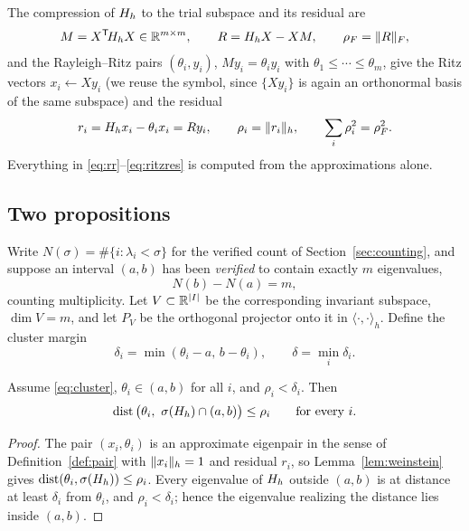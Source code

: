 The compression of $H_h$ to the trial subspace and its residual are
\begin{equation}
  M = X^{\mathsf T}\!H_h X\in\mathbb{R}^{m\times m},\qquad
  R = H_h X - X M ,
  \qquad \rho_F=\lVert R\rVert_F ,
  \label{eq:rr}
\end{equation}
and the Rayleigh--Ritz pairs $(\theta_i,y_i)$, $My_i=\theta_iy_i$ with
$\theta_1\le\cdots\le\theta_m$, give the Ritz vectors $x_i\leftarrow X y_i$
(we reuse the symbol, since $\{Xy_i\}$ is again an orthonormal basis of the
same subspace) and the residual
\begin{equation}
  r_i=H_h x_i-\theta_i x_i = R y_i ,\qquad
  \rho_i=\lVert r_i\rVert_h,\qquad \sum_i \rho_i^2=\rho_F^2 .
  \label{eq:ritzres}
\end{equation}
Everything in \eqref{eq:rr}--\eqref{eq:ritzres} is computed from the
approximations alone.

\subsection{Two propositions}
\label{sec:props}

Write $N(\sigma)=\#\{i:\lambda_i<\sigma\}$ for the verified count of
Section~\ref{sec:counting}, and suppose an interval $(a,b)$ has been
\emph{verified} to contain exactly $m$ eigenvalues,
\begin{equation}
  N(b)-N(a)=m ,
  \label{eq:cluster}
\end{equation}
counting multiplicity. Let $V\subset\mathbb{R}^{|I|}$ be the corresponding invariant
subspace, $\dim V=m$, and let $P_V$ be the orthogonal projector onto it in
$\langle\cdot,\cdot\rangle_h$. Define the cluster margin
\begin{equation}
  \delta_i=\min(\theta_i-a,\,b-\theta_i),\qquad \delta=\min_i\delta_i .
  \label{eq:margin}
\end{equation}

\begin{lemma}\label{lem:cluster}
  Assume \eqref{eq:cluster}, $\theta_i\in(a,b)$ for all $i$, and
  $\rho_i<\delta_i$. Then
  \[
    \operatorname{dist}\big(\theta_i,\ \spec(\Hh)\cap(a,b)\big)\le\rho_i
    \qquad\text{for every }i .
  \]
\end{lemma}
\begin{proof}
  The pair $(x_i,\theta_i)$ is an approximate eigenpair in the sense of
  Definition~\ref{def:pair} with $\lVert x_i\rVert_h=1$ and residual $r_i$, so
  Lemma~\ref{lem:weinstein} gives
  $\operatorname{dist}(\theta_i,\sigma(H_h))\le\rho_i$. Every eigenvalue of
  $H_h$ outside $(a,b)$ is at distance at least $\delta_i$ from $\theta_i$,
  and $\rho_i<\delta_i$; hence the eigenvalue realizing the distance lies
  inside $(a,b)$.
\end{proof}

